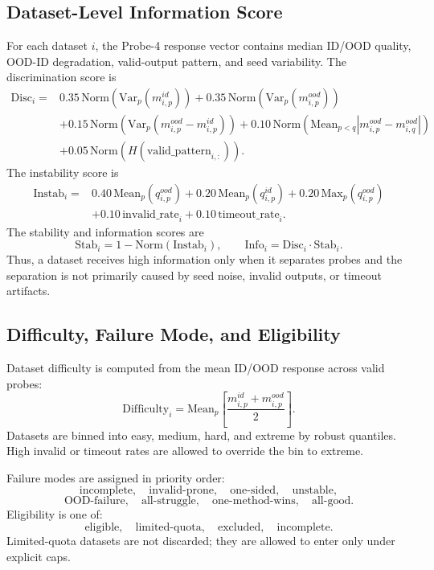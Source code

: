 \subsection{Dataset-Level Information Score}
\label{app:dataset-information-score}

For each dataset \(i\), the Probe-4 response vector contains median ID/OOD quality, OOD-ID degradation, valid-output pattern, and seed variability. The discrimination score is
\[
\begin{aligned}
\mathrm{Disc}_i
={}&
0.35\,\mathrm{Norm}\!\left(\mathrm{Var}_{p}(m_{i,p}^{id})\right)
+
0.35\,\mathrm{Norm}\!\left(\mathrm{Var}_{p}(m_{i,p}^{ood})\right)\\
&+
0.15\,\mathrm{Norm}\!\left(\mathrm{Var}_{p}(m_{i,p}^{ood}-m_{i,p}^{id})\right)
+
0.10\,\mathrm{Norm}\!\left(\mathrm{Mean}_{p<q}|m_{i,p}^{ood}-m_{i,q}^{ood}|\right)\\
&+
0.05\,\mathrm{Norm}\!\left(H(\mathrm{valid\_pattern}_{i,:})\right).
\end{aligned}
\]
The instability score is
\[
\begin{aligned}
\mathrm{Instab}_i
={}&
0.40\,\mathrm{Mean}_{p}(q_{i,p}^{ood})
+
0.20\,\mathrm{Mean}_{p}(q_{i,p}^{id})
+
0.20\,\mathrm{Max}_{p}(q_{i,p}^{ood})\\
&+
0.10\,\mathrm{invalid\_rate}_i
+
0.10\,\mathrm{timeout\_rate}_i.
\end{aligned}
\]
The stability and information scores are
\[
\mathrm{Stab}_i
=
1-\mathrm{Norm}(\mathrm{Instab}_i),
\qquad
\mathrm{Info}_i
=
\mathrm{Disc}_i\cdot \mathrm{Stab}_i.
\]
Thus, a dataset receives high information only when it separates probes and the separation is not primarily caused by seed noise, invalid outputs, or timeout artifacts.


\subsection{Difficulty, Failure Mode, and Eligibility}
\label{app:difficulty-failure-eligibility}

Dataset difficulty is computed from the mean ID/OOD response across valid probes:
\[
\mathrm{Difficulty}_i
=
\mathrm{Mean}_{p}
\left[
\frac{
m_{i,p}^{id}
+
m_{i,p}^{ood}
}{2}
\right].
\]
Datasets are binned into easy, medium, hard, and extreme by robust quantiles. High invalid or timeout rates are allowed to override the bin to extreme.

Failure modes are assigned in priority order:
\[
\mathrm{incomplete},
\quad
\mathrm{invalid\mbox{-}prone},
\quad
\mathrm{one\mbox{-}sided},
\quad
\mathrm{unstable},
\]
\[
\mathrm{OOD\mbox{-}failure},
\quad
\mathrm{all\mbox{-}struggle},
\quad
\mathrm{one\mbox{-}method\mbox{-}wins},
\quad
\mathrm{all\mbox{-}good}.
\]
Eligibility is one of:
\[
\mathrm{eligible},
\quad
\mathrm{limited\mbox{-}quota},
\quad
\mathrm{excluded},
\quad
\mathrm{incomplete}.
\]
Limited-quota datasets are not discarded; they are allowed to enter \core{} only under explicit caps.


